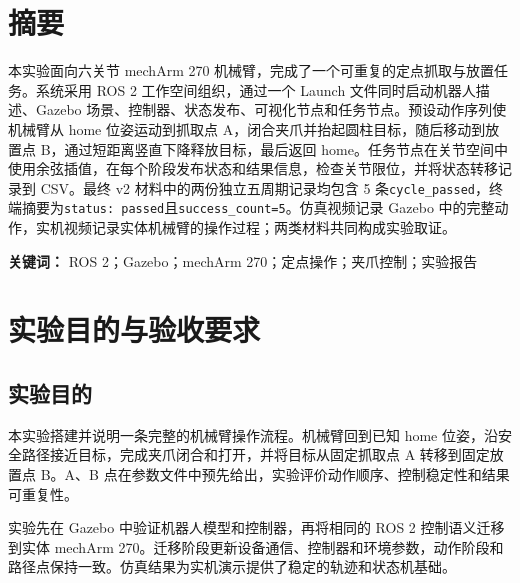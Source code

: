 \documentclass[UTF8,11pt,a4paper]{ctexart}
\newcommand{\code}[1]{\texttt{\footnotesize #1}}\newcommand{\resultbox}[1]{\begin{center}\fcolorbox{Navy}{Sky}{\parbox{0.93\textwidth}{\small #1}}\end{center}}
\begin{document}
\section*{摘要}
本实验面向六关节 mechArm 270 机械臂，完成了一个可重复的定点抓取与放置任务。系统采用 ROS 2 工作空间组织，通过一个 Launch 文件同时启动机器人描述、Gazebo 场景、控制器、状态发布、可视化节点和任务节点。预设动作序列使机械臂从 home 位姿运动到抓取点 A，闭合夹爪并抬起圆柱目标，随后移动到放置点 B，通过短距离竖直下降释放目标，最后返回 home。任务节点在关节空间中使用余弦插值，在每个阶段发布状态和结果信息，检查关节限位，并将状态转移记录到 CSV。最终 v2 材料中的两份独立五周期记录均包含 5 条\code{cycle\_passed}，终端摘要为\code{status: passed}且\code{success\_count=5}。仿真视频记录 Gazebo 中的完整动作，实机视频记录实体机械臂的操作过程；两类材料共同构成实验取证。\par
\noindent\textbf{关键词：} ROS 2；Gazebo；mechArm 270；定点操作；夹爪控制；实验报告

\section{实验目的与验收要求}
\subsection{实验目的}
本实验搭建并说明一条完整的机械臂操作流程。机械臂回到已知 home 位姿，沿安全路径接近目标，完成夹爪闭合和打开，并将目标从固定抓取点 A 转移到固定放置点 B。A、B 点在参数文件中预先给出，实验评价动作顺序、控制稳定性和结果可重复性。

实验先在 Gazebo 中验证机器人模型和控制器，再将相同的 ROS 2 控制语义迁移到实体 mechArm 270。迁移阶段更新设备通信、控制器和环境参数，动作阶段和路径点保持一致。仿真结果为实机演示提供了稳定的轨迹和状态机基础。
\end{document}
